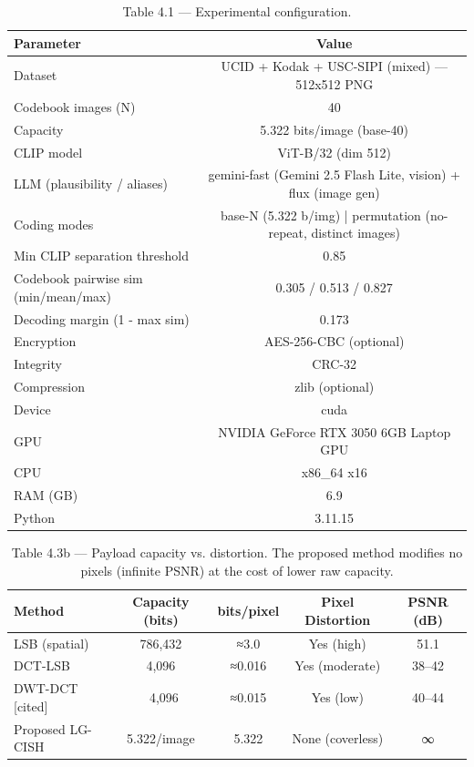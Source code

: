 

\begin{table}[htbp]
\centering
\caption{Table 4.1 — Experimental configuration.}
\label{tab:table_4_1_setup}
\begin{tabular}{lc}
\hline
Parameter & Value \\
\hline
Dataset & UCID + Kodak + USC-SIPI (mixed) — 512x512 PNG \\
Codebook images (N) & 40 \\
Capacity & 5.322 bits/image (base-40) \\
CLIP model & ViT-B/32 (dim 512) \\
LLM (plausibility / aliases) & gemini-fast (Gemini 2.5 Flash Lite, vision) + flux (image gen) \\
Coding modes & base-N (5.322 b/img) | permutation (no-repeat, distinct images) \\
Min CLIP separation threshold & 0.85 \\
Codebook pairwise sim (min/mean/max) & 0.305 / 0.513 / 0.827 \\
Decoding margin (1 - max sim) & 0.173 \\
Encryption & AES-256-CBC (optional) \\
Integrity & CRC-32 \\
Compression & zlib (optional) \\
Device & cuda \\
GPU & NVIDIA GeForce RTX 3050 6GB Laptop GPU \\
CPU & x86_64 x16 \\
RAM (GB) & 6.9 \\
Python & 3.11.15 \\
\hline
\end{tabular}
\end{table}


\begin{table}[htbp]
\centering
\caption{Table 4.3b — Payload capacity vs. distortion. The proposed method modifies no pixels (infinite PSNR) at the cost of lower raw capacity.}
\label{tab:table_4_3_capacity}
\begin{tabular}{lcccc}
\hline
Method & Capacity (bits) & bits/pixel & Pixel Distortion & PSNR (dB) \\
\hline
LSB (spatial) & 786,432 & ≈3.0 & Yes (high) & 51.1 \\
DCT-LSB & 4,096 & ≈0.016 & Yes (moderate) & 38–42 \\
DWT-DCT [cited] & ~4,096 & ≈0.015 & Yes (low) & 40–44 \\
Proposed LG-CISH & 5.322/image & 5.322 & None (coverless) & ∞ \\
\hline
\end{tabular}
\end{table}


